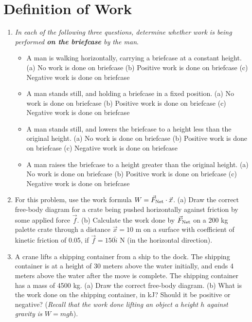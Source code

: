 \documentclass[10pt]{article}
\begin{document}
\maketitle

\section{Definition of Work}
\begin{enumerate}
\item \textit{In each of the following three questions, determine whether work is being performed \textbf{on the briefcase} by the man}.
\begin{itemize}
\item A man is walking horizontally, carrying a briefcase at a constant height. (a) No work is done on briefcase (b) Positive work is done on briefcase (c) Negative work is done on briefcase
\item A man stands still, and holding a briefcase in a fixed position.  (a) No work is done on briefcase (b) Positive work is done on briefcase (c) Negative work is done on briefcase
\item A man stands still, and lowers the briefcase to a height less than the original height.  (a) No work is done on briefcase (b) Positive work is done on briefcase (c) Negative work is done on briefcase
\item A man raises the briefcase to a height greater than the original height.  (a) No work is done on briefcase (b) Positive work is done on briefcase (c) Negative work is done on briefcase
\end{itemize}
\item For this problem, use the work formula $W = \vec{F}_{\rm Net} \cdot \vec{x}$.  (a) Draw the correct free-body diagram for a crate being pushed horizontally against friction by some applied force $\vec{f}$.  (b) Calculate the work done by $\vec{F}_{\rm Net}$ on a 200 kg palette crate through a distance $\vec{x} = 10$ m on a surface with coefficient of kinetic friction of 0.05, if $\vec{f} = 150\hat{i}$ N (in the horizontal direction).  \\ \vspace{2cm}
\item A crane lifts a shipping container from a ship to the dock.  The shipping container is at a height of 30 meters above the water initially, and ends 4 meters above the water after the move is complete.  The shipping container has a mass of 4500 kg.  (a) Draw the correct free-body diagram.  (b) What is the work done on the shipping container, in kJ?  Should it be positive or negative? (\textit{Recall that the work done lifting an object a height $h$ against gravity is $W = mgh$}).\\ \vspace{2cm}
\end{enumerate}
\end{document}
